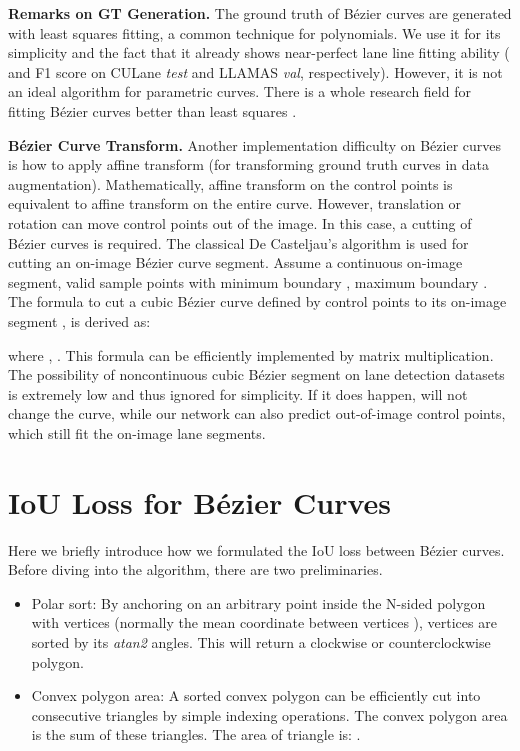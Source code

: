 \documentclass[10pt,twocolumn,letterpaper]{article}
\begin{document}
\noindent \textbf{Remarks on GT Generation.} The ground truth of Bézier curves are generated with least squares fitting, a common technique for polynomials. We use it for its simplicity and the fact that it already shows near-perfect lane line fitting ability ( and   F1 score on CULane \textit{test} and LLAMAS \textit{val}, respectively). However, it is not an ideal algorithm for parametric curves. There is a whole research field for fitting Bézier curves better than least squares \cite{pastva1998bezier}.

\noindent \textbf{Bézier Curve Transform.} Another implementation difficulty on Bézier curves is how to apply affine transform (for transforming ground truth curves in data augmentation). Mathematically, affine transform on the control points is equivalent to affine transform on the entire curve. However, translation or rotation can move control points out of the image. In this case, a cutting of Bézier curves is required. The classical De Casteljau's algorithm is used for cutting an on-image Bézier curve segment. Assume a continuous on-image segment, valid sample points with minimum boundary , maximum boundary . The formula to cut a cubic Bézier curve defined by control points  to its on-image segment , is derived as:

\vspace{-5mm}


where , . This formula can be efficiently implemented by matrix multiplication. The possibility of noncontinuous cubic Bézier segment on lane detection datasets is extremely low and thus ignored for simplicity. If it does happen,  will not change the curve, while our network can also predict out-of-image control points, which still fit the on-image lane segments.



\section{IoU Loss for Bézier Curves}
\label{sec:iou}

Here we briefly introduce how we formulated the IoU loss between Bézier curves. Before diving into the algorithm, there are two preliminaries.

\begin{itemize}
\vspace{-2mm}
    \item Polar sort: By anchoring on an arbitrary point inside the N-sided polygon with vertices  (normally the mean coordinate between vertices ), vertices are sorted by its \textit{atan2} angles. This will return a clockwise or counterclockwise polygon.
\vspace{-2mm}
    \item Convex polygon area: A sorted convex polygon can be efficiently cut into consecutive triangles by simple indexing operations. The convex polygon area is the sum of these triangles. The area  of triangle  is: .
\vspace{-2mm}
\end{itemize}
\end{document}
